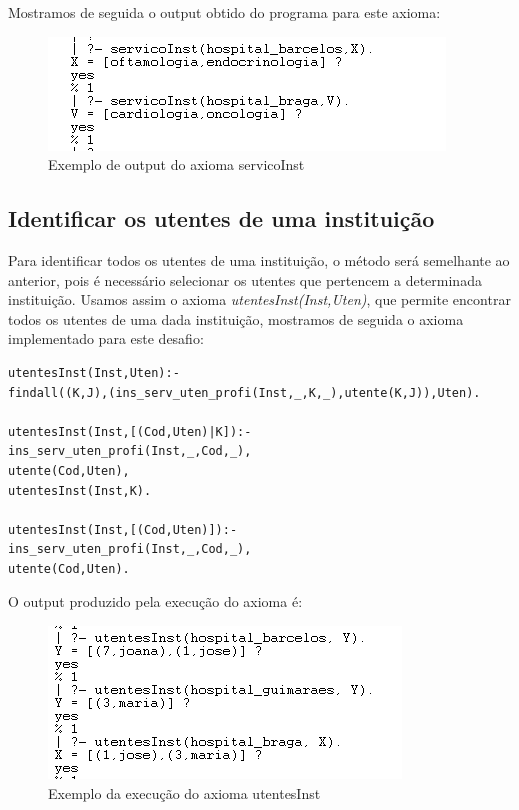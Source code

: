Mostramos de seguida o output obtido do programa para este axioma: 

\begin{figure}[<+htpb+>]
	\centering
	\includegraphics[scale=0.9]{answer1.png}
	\caption{Exemplo de output do axioma servicoInst}
	\label{p3:fig:output1}
\end{figure}

\subsection{Identificar os utentes de uma instituição}
Para identificar todos os utentes de uma instituição, o método será semelhante ao anterior, pois é necessário selecionar os utentes que pertencem a determinada instituição. Usamos assim o axioma \textit{utentesInst(Inst,Uten)}, que permite encontrar todos os utentes de uma dada instituição, mostramos de seguida o axioma implementado para este desafio: 

\begin{verbatim}
utentesInst(Inst,Uten):-
findall((K,J),(ins_serv_uten_profi(Inst,_,K,_),utente(K,J)),Uten).      

utentesInst(Inst,[(Cod,Uten)|K]):- 
ins_serv_uten_profi(Inst,_,Cod,_),
utente(Cod,Uten),
utentesInst(Inst,K).

utentesInst(Inst,[(Cod,Uten)]):-
ins_serv_uten_profi(Inst,_,Cod,_),
utente(Cod,Uten).
\end{verbatim}

O output produzido pela execução do axioma é:
\begin{figure}[<+htpb+>]
	\centering
	\includegraphics[scale=0.9]{answer2.png}
	\caption{Exemplo da execução do axioma utentesInst}
	\label{p3:fig:output2}
\end{figure}


